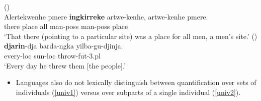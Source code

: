 \documentclass{article}
\begin{document}
\begin{exe}
   (\citealt[132]{wilkins89})\\
  \gll Alertekwenhe pmere \textbf{ingkirreke} artwe-kenhe, artwe-kenhe pmere.\\
  there place all man-{\sc poss} man-{\sc poss} place\\
  \glt `That there (pointing to a particular site)
  was a place for all men, a men's site.'
   (\citealt[48]{sands89}) \\
  \gll \textbf{djarin}-dja barda-ngka yilba-gu-djinja.\\
  every-{\sc loc} sun-{\sc loc}   throw-{\sc fut}-3.{\sc pl}\\
  \glt    `Every day he threw them [the people].'
\end{exe}

\begin{itemize}
\item Languages also do not lexically distinguish between quantification over sets of individuals (\ref{univ1}) versus over subparts of a single individual (\ref{univ2}).
\end{itemize}
\end{document}
